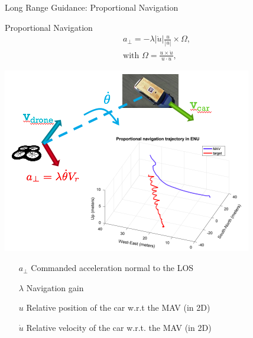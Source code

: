 \begin{frame}{Long Range Guidance: Proportional Navigation}
	
	\begin{minipage}[b]{0.45\linewidth}
            \centering
        		Proportional Navigation 
		\begin{align*}
			&a_{\perp} = - \lambda |\dot{u}| \frac{u}{|u|} \times \Omega, \\
			&\text{with } \Omega = \frac{u \times \dot{u}}{u \cdot u},
		\end{align*}
        \end{minipage}
        \hspace{0.5cm}
        \begin{minipage}[b]{0.45\linewidth}
            \centering
            \includegraphics[width=\textwidth]{figures/PNpic.png}\\
         \end{minipage}


	\begin{enumerate}
	\item[$a_{\perp}$] Commanded acceleration normal to the LOS %
	\item[$\lambda$] Navigation gain
	\item[$u$] Relative position of the car w.r.t the MAV (in 2D)
	\item[$\dot{u}$] Relative velocity of the car w.r.t. the MAV (in 2D)
	\end{enumerate}
\end{frame}

